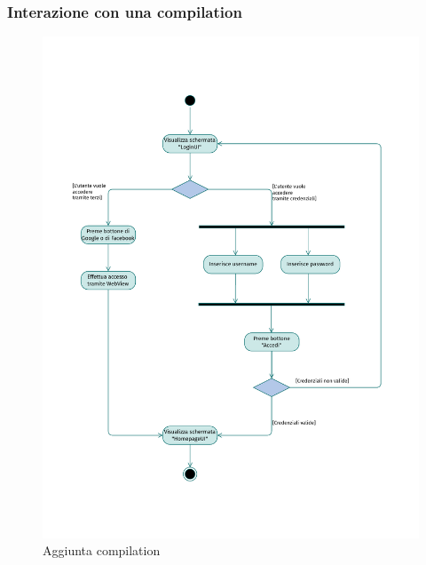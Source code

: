 \documentclass{natourDoc}
\begin{document}
	\subsubsection{Interazione con una compilation}
	\begin{figure}[!htbp]
		\centering
		\includegraphics[width=\textwidth, page=8]{./diagrams/activity.pdf}
		\caption{Aggiunta compilation}
	\end{figure}
	\FloatBarrier
\end{document}
